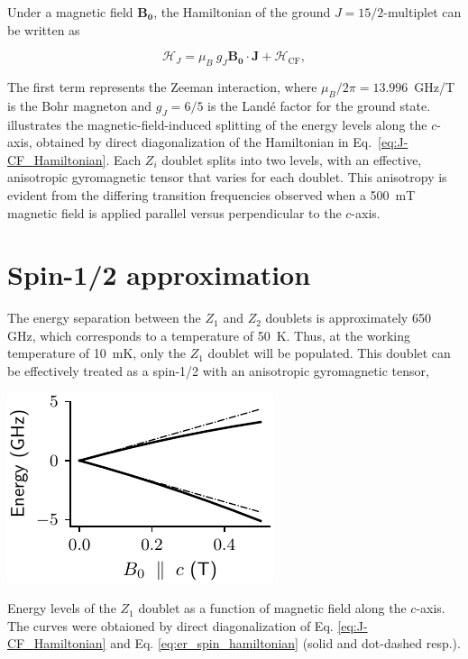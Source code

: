Under a magnetic field $\mathbf{B_0}$, the Hamiltonian of the ground $J=15/2$-multiplet can be written as 

\begin{equation}
    \label{eq:J-CF_Hamiltonian}
    \mathcal{H}_J = \mu_B \ g_J\mathbf{B_0}\cdot \mathbf{J} + \mathcal{H}_{\mathrm{CF}},
\end{equation}

The first term represents the Zeeman interaction, where $\mu_B/2\pi = 13.996$~GHz/T is the Bohr magneton and $g_J = 6/5$ is the Landé factor for the \Er ground state.  illustrates the magnetic-field-induced splitting of the energy levels along the $c$-axis, obtained by direct diagonalization of the Hamiltonian in Eq.~\ref{eq:J-CF_Hamiltonian}. Each $Z_i$ doublet splits into two levels, with an effective, anisotropic gyromagnetic tensor that varies for each doublet. This anisotropy is evident from the differing transition frequencies observed when a 500~mT magnetic field is applied parallel versus perpendicular to the $c$-axis. 

\section{Spin-1/2 approximation}

The energy separation between the $Z_1$ and $Z_2$ doublets is approximately 650 GHz, which corresponds to a temperature of 50~K. Thus, at the working temperature of 10~mK, only the $Z_1$ doublet will be populated. This doublet can be effectively treated as a spin-1/2 with an anisotropic gyromagnetic tensor,

\begin{marginfigure}
    \includegraphics{chapter2/figures/energy_levels_vs_Bz_Z1.pdf}
    \caption[Zeeman splitting of the $Z_1$ doublet]{Energy levels of the $Z_1$ doublet as a function of magnetic field along the $c$-axis. The curves were obtaioned by direct diagonalization of Eq. \ref{eq:J-CF_Hamiltonian} and Eq. \ref{eq:er_spin_hamiltonian} (solid and dot-dashed resp.).}
\end{marginfigure}

